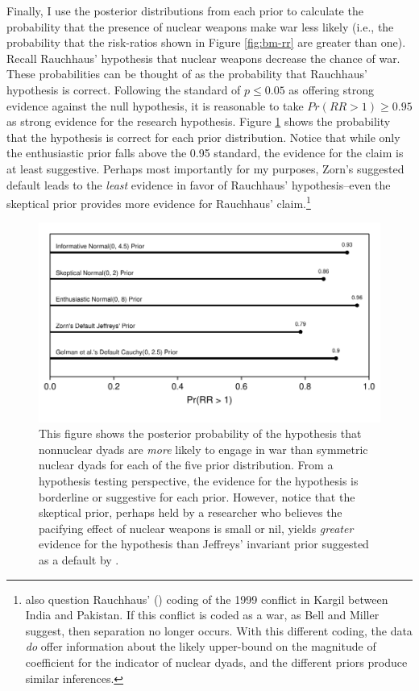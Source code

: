 \documentclass[12pt]{article}
\begin{document}
Finally, I use the posterior distributions from each prior to calculate the probability that the presence of nuclear weapons make war less likely (i.e., the probability that the risk-ratios shown in Figure \ref{fig:bm-rr} are greater than one). 
Recall Rauchhaus' hypothesis that nuclear weapons decrease the chance of war. 
These probabilities can be thought of as the probability that Rauchhaus' hypothesis is correct. 
Following the standard of $p \leq 0.05$ as offering strong evidence against the null hypothesis, it is reasonable to take $Pr(RR > 1) \geq 0.95$ as strong evidence for the research hypothesis. 
Figure \ref{fig:bm-pr-hypothesis} shows the probability that the hypothesis is correct for each prior distribution. 
Notice that while only the enthusiastic prior falls above the 0.95 standard, the evidence for the claim is at least suggestive. 
Perhaps most importantly for my purposes, Zorn's suggested default leads to the \emph{least} evidence in favor of Rauchhaus' hypothesis--even the skeptical prior provides more evidence for Rauchhaus' claim.\footnote{
\cite{BellMiller2015} also question Rauchhaus' (\citeyear{Rauchhaus2009}) coding of the 1999 conflict in Kargil between India and Pakistan. 
If this conflict is coded as a war, as Bell and Miller suggest, then separation no longer occurs. 
With this different coding, the data \textit{do} offer information about the likely upper-bound on the magnitude of coefficient for the indicator of nuclear dyads, and the different priors produce similar inferences.}

\begin{figure}[H]
\begin{center}
\includegraphics[scale = .8]{figs/bm-pr-hypothesis.pdf}
\caption{This figure shows the posterior probability of the hypothesis that nonnuclear dyads are \emph{more} likely to engage in war than symmetric nuclear dyads for each of the five prior distribution. 
From a hypothesis testing perspective, the evidence for the hypothesis is borderline or suggestive for each prior. 
However, notice that the skeptical prior, perhaps held by a researcher who believes the pacifying effect of nuclear weapons is small or nil, yields \emph{greater} evidence for the hypothesis than Jeffreys' invariant prior suggested as a default by \cite{Zorn2005}.}\label{fig:bm-pr-hypothesis}
\end{center}
\end{figure}
\end{document}
